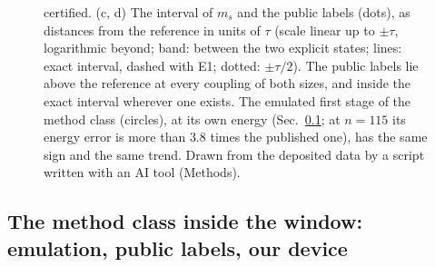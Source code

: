 \documentclass[aps,prx,twocolumn,10pt,superscriptaddress,nofootinbib,longbibliography,floatfix]{revtex4-2}
\theoremstyle{remark}
\newcommand{\ms}{m_s}
\begin{document}
\begin{figure}[t]
{certified.
(c, d) The interval of $\ms$ and the public labels (dots), as distances from the reference in units of $\tau$
(scale linear up to $\pm\tau$, logarithmic beyond; band: between the two explicit states; lines: exact interval,
dashed with E1; dotted: $\pm\tau/2$). The public labels lie above the reference at every coupling of both sizes, and
inside the exact interval wherever one exists. The emulated first stage of the method class (circles), at its own energy
(Sec.~\ref{sec:method}; at $n=115$ its energy error is more than $3.8$ times the published one), has the same sign %
and the same trend. Drawn from the deposited data by a script written with an AI tool (Methods).}
\end{figure}

\subsection{The method class inside the window: emulation, public labels, our device}
\label{sec:method}
\end{document}
